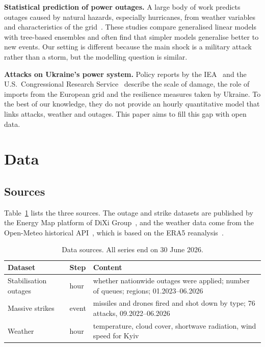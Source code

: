 \documentclass[9pt,twocolumn,letterpaper]{extarticle}
\begin{document}
\textbf{Statistical prediction of power outages.} A large body of work predicts outages caused by natural hazards, especially hurricanes, from weather variables and characteristics of the grid~\cite{han,nateghi}. These studies compare generalised linear models with tree-based ensembles and often find that simpler models generalise better to new events. Our setting is different because the main shock is a military attack rather than a storm, but the modelling question is similar.

\textbf{Attacks on Ukraine's power system.} Policy reports by the IEA~\cite{iea} and the U.S.\ Congressional Research Service~\cite{crs} describe the scale of damage, the role of imports from the European grid and the resilience measures taken by Ukraine. To the best of our knowledge, they do not provide an hourly quantitative model that links attacks, weather and outages. This paper aims to fill this gap with open data.

\section{Data}

\subsection{Sources}
Table~\ref{tab:data} lists the three sources. The outage and strike datasets are published by the Energy Map platform of DiXi Group~\cite{dixiout,dixistr}, and the weather data come from the Open-Meteo historical API~\cite{openmeteo}, which is based on the ERA5 reanalysis~\cite{era5}.

\begin{table}[t]
\centering\small
\caption{Data sources. All series end on 30 June 2026.}
\label{tab:data}
\begin{tabular}{@{}p{2.15cm}p{1.15cm}p{3.6cm}@{}}
\toprule
Dataset & Step & Content \\
\midrule
Stabilisation outages~\cite{dixiout} & hour & whether nationwide outages were applied; number of queues; regions; 01.2023--06.2026 \\
Massive strikes~\cite{dixistr} & event & missiles and drones fired and shot down by type; 76 attacks, 09.2022--06.2026 \\
Weather~\cite{openmeteo} & hour & temperature, cloud cover, shortwave radiation, wind speed for Kyiv \\
\bottomrule
\end{tabular}
\end{table}
\end{document}
